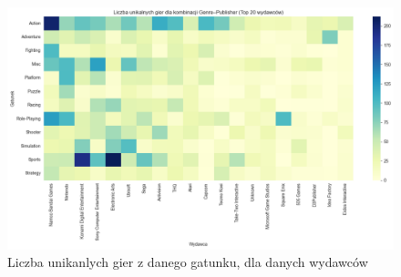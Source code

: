 \documentclass[11pt]{article}
\begin{document}
\begin{figure}[H]
    \centering
    \includegraphics[width=0.9\linewidth]{figures/Genre-Publisher}
    \caption{Liczba unikanlych gier z danego gatunku, dla danych wydawców}
    \label{fig:wydawcy0}
\end{figure}
\end{document}
